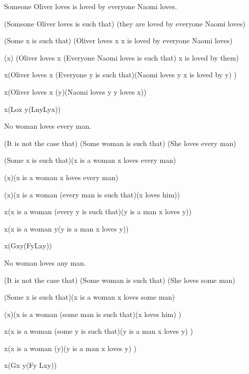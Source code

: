 \begin{argument}
\item[\textbf{(3)}] Someone Oliver loves is loved by everyone Naomi loves.
\item[$\simeq$] (Someone Oliver loves is such that)
  (they are loved by everyone Naomi loves)
\item[$\simeq$] (Some x is such that)
  (Oliver loves x \eand x is loved by everyone Naomi loves)
\item[$\simeq$] (\eexists x)
  (Oliver loves x \eand (Everyone Naomi loves is such that) x is loved by them)
\item[$\simeq$] \eexists x(Oliver loves x \eand
  (Everyone y is such that)(Naomi loves y \eif x is loved by y) )
\item[$\simeq$] \eexists x(Oliver loves x \eand
  (\eforall y)(Naomi loves y \eif y loves x))
\item[$\simeq$] \eexists x(Lox \eand\eforall y(Lny\eif Lyx))
\end{argument}

\begin{argument}
\item[\textbf{(4)}] No woman loves every man.
\item[$\simeq$] (It is not the case that)
  (Some woman is such that)
  (She loves every man)
\item[$\simeq$] \enot(Some x is such that)(x is a woman \eand x loves every man)
\item[$\simeq$] \enot(\eexists x)(x is a woman \eand x loves every man)
\item[$\simeq$] \enot(\eexists x)(x is a woman \eand
  (every man is such that)(x loves him))
\item[$\simeq$] \enot\eexists x(x is a woman \eand
  (every y is such that)(y is a man \eif x loves y))
\item[$\simeq$] \enot\eexists x(x is a woman \eand\eforall y(y is a man
  \eif x loves y))
\item[$\simeq$] \enot\eexists x(Gx\eand\eforall y(Fy\eif Lxy))
\end{argument}

\begin{argument}
\item[\textbf{(5)}] No woman loves any man.
\item[$\simeq$] (It is not the case that)
  (Some woman is such that)
  (She loves some man)
\item[$\simeq$] \enot(Some x is such that)(x is a woman \eand x loves some man)
\item[$\simeq$] \enot(\eexists x)(x is a woman \eand
  (some man is such that)(x loves him) )
\item[$\simeq$] \enot\eexists x(x is a woman \eand
  (some y is such that)(y is a man \eand x loves y) )
\item[$\simeq$] \enot\eexists x(x is a woman \eand
  (\eexists y)(y is a man \eand x loves y) )
\item[$\simeq$] \enot\eexists x(Gx \eand\eexists y(Fy \eand Lxy))
\end{argument}

